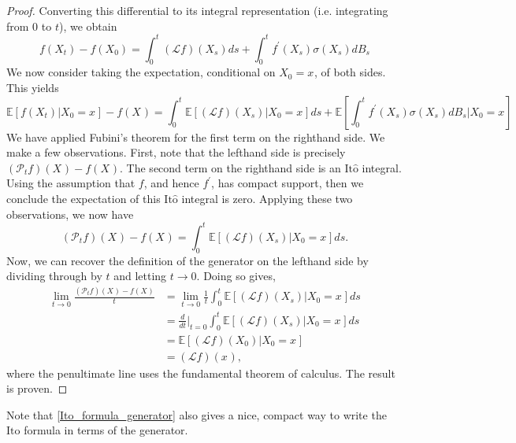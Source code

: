 \documentclass[12pt]{article}
\newcommand{\E}{\mathbb{E}}
\newcommand{\state}[1][t]{X_{#1}}
\newcommand{\stateValue}[1][t]{x_{#1}}
\newcommand{\BM}[1][t]{B_{#1}} %
\newcommand{\op}[1][t]{\mathcal{P}_{#1}} %
\newcommand{\gen}{\mathcal{L}} %
\newcommand{\ito}{\text{It}\hat{\text{o}}}
\begin{document}
\begin{proof}
Converting this differential to its integral representation (i.e. integrating from $0$ to $t$), we obtain 
\[
f(\state) - f(\state[0]) = \int_{0}^{t} (\gen f)(\state[s]) ds + \int_{0}^{t} f^\prime(\state[s]) \sigma(\state[s]) d\BM[s]
\]
We now consider taking the expectation, conditional on $\state[0] = \stateValue[]$, of both sides. This yields 
\[
\E[f(\state) | \state[0] = \stateValue[]] - f(\state[]) = \int_{0}^{t} \E[(\gen f)(\state[s]) | \state[0] = \stateValue[]] ds + \E\left[\int_{0}^{t} f^\prime(\state[s]) \sigma(\state[s]) d\BM[s] \bigg| \state[0] = \stateValue[] \right] 
\]
We have applied Fubini's theorem for the first term on the righthand side. We make a few observations. First, note that the lefthand side is precisely $(\op f)(\state[]) - f(\state[])$. The second term on the righthand side 
is an $\ito$ integral. Using the assumption that $f$, and hence $f^\prime$, has compact support, then we conclude the expectation of this $\ito$ integral is zero. Applying these two observations, we now have
\[
(\op f)(\state[]) - f(\state[])  = \int_{0}^{t} \E[(\gen f)(\state[s]) | \state[0] = \stateValue[]] ds.
\] 
Now, we can recover the definition of the generator on the lefthand side by dividing through by $t$ and letting $t \to 0$. Doing so gives, 
\begin{align*}
\lim_{t \to 0} \frac{(\op f)(\state[]) - f(\state[]) }{t} 
&= \lim_{t \to 0} \frac{1}{t} \int_{0}^{t} \E[(\gen f)(\state[s]) | \state[0] = \stateValue[]] ds \\
&= \frac{d}{dt}\bigg|_{t=0} \int_{0}^{t} \E[(\gen f)(\state[s]) | \state[0] = \stateValue[]] ds \\
&= \E[(\gen f)(\state[0]) | \state[0] = \stateValue[]] \\
&= (\gen f)(\stateValue[]), 
\end{align*}
where the penultimate line uses the fundamental theorem of calculus. The result is proven. 
\end{proof}

Note that \ref{Ito_formula_generator} also gives a nice, compact way to write the $\ito$ formula in terms of the generator. 
\end{document}
